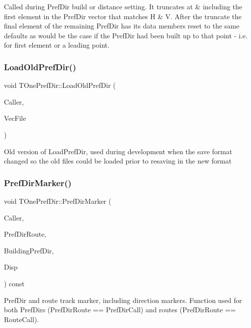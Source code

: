 Called during Pref\+Dir build or distance setting. It truncates at \& including the first element in the Pref\+Dir vector that matches H \& V. After the truncate the final element of the remaining Pref\+Dir has its data members reset to the same defaults as would be the case if the Pref\+Dir had been built up to that point -\/ i.\+e. for first element or a leading point. \mbox{\label{class_t_one_pref_dir_a614933ff3958e4b8c9be9bc78159d9e8}} 
\subsubsection{\texorpdfstring{Load\+Old\+Pref\+Dir()}{LoadOldPrefDir()}}
{\footnotesize\ttfamily void T\+One\+Pref\+Dir\+::\+Load\+Old\+Pref\+Dir (\begin{DoxyParamCaption}\item[{int}]{Caller,  }\item[{std\+::ifstream \&}]{Vec\+File }\end{DoxyParamCaption})}

Old version of Load\+Pref\+Dir, used during development when the save format changed so the old files could be loaded prior to resaving in the new format \mbox{\label{class_t_one_pref_dir_aef8388386635d73a921fae7ce43f5214}} 
\subsubsection{\texorpdfstring{Pref\+Dir\+Marker()}{PrefDirMarker()}}
{\footnotesize\ttfamily void T\+One\+Pref\+Dir\+::\+Pref\+Dir\+Marker (\begin{DoxyParamCaption}\item[{int}]{Caller,  }\item[{T\+Pref\+Dir\+Route}]{Pref\+Dir\+Route,  }\item[{bool}]{Building\+Pref\+Dir,  }\item[{\mbox{\hyperlink{class_t_display}{T\+Display}} $\ast$}]{Disp }\end{DoxyParamCaption}) const}

Pref\+Dir and route track marker, including direction markers. Function used for both Pref\+Dirs (Pref\+Dir\+Route == Pref\+Dir\+Call) and routes (Pref\+Dir\+Route == Route\+Call).

